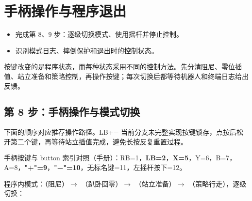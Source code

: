 \chapter{手柄操作与程序退出}
\begin{intro}
\begin{itemize}
\item 完成第 8、9 步：逐级切换模式、使用摇杆并停止控制。
\item 识别模式日志、摔倒保护和退出时的控制状态。
\end{itemize}
\end{intro}
按键改变的是程序状态，而每种状态采用不同的控制方法。先分清阻尼、零位插值、站立准备和策略控制，再操作按键；每次切换后都等待机器人和终端日志给出反馈。

\section{第 8 步：手柄操作与模式切换}
\label{step:8}
下面的顺序对应推荐操作路径。LB+− 当前分支未完整实现按键锁存，点按后松开第二个键，再等待站立插值完成，避免长按反复重置过程。


手柄按键与 button 索引对照（手册）：RB=1，\textbf{LB=2}，\textbf{X=5}，Y=6，B=7，A=8，\textbf{"+"=9}，\textbf{"−"=10}，无标名键=11，左摇杆按下=12。

程序内模式：（阻尼）$\rightarrow$ （趴卧回零）$\rightarrow$ （站立准备）$\rightarrow$ （策略行走），逐级切换：

